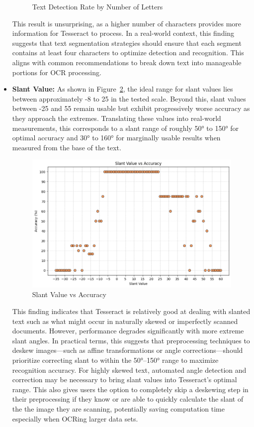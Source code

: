 \documentclass[10pt,twocolumn]{article}
\begin{document}
\begin{itemize}
\begin{figure}[h!]
    \caption{Text Detection Rate by Number of Letters}
    \label{fig:FigE}
\end{figure}
This result is unsurprising, as a higher number of characters provides more information for Tesseract to process. In a real-world context, this finding suggests that text segmentation strategies should ensure that each segment contains at least four characters to optimize detection and recognition. This aligns with common recommendations to break down text into manageable portions for OCR processing.
\item\textbf{Slant Value:} As shown in Figure~\ref{fig:FigF}, the ideal range for slant values lies between approximately -8 to 25 in the tested scale. Beyond this, slant values between -25 and 55 remain usable but exhibit progressively worse accuracy as they approach the extremes. Translating these values into real-world measurements, this corresponds to a slant range of roughly 50° to 150° for optimal accuracy and 30° to 160° for marginally usable results when measured from the base of the text. 
\begin{figure}[h!]
    \centering
    \includegraphics[width=\linewidth]{Figures/Figure_F.png}
    \caption{Slant Value vs Accuracy}
    \label{fig:FigF}
\end{figure}
This finding indicates that Tesseract is relatively good at dealing with slanted text such as what might occur in naturally skewed or imperfectly scanned documents. However, performance degrades significantly with more extreme slant angles. In practical terms, this suggests that preprocessing techniques to deskew images—such as affine transformations or angle corrections—should prioritize correcting slant to within the 50°–150° range to maximize recognition accuracy. For highly skewed text, automated angle detection and correction may be necessary to bring slant values into Tesseract’s optimal range. This also gives users the option to completely skip a deskewing step in their preprocessing if they know or are able to quickly calculate the slant of the the image they are scanning, potentially saving computation time especially when OCRing larger data sets.

\end{itemize}
\end{document}
